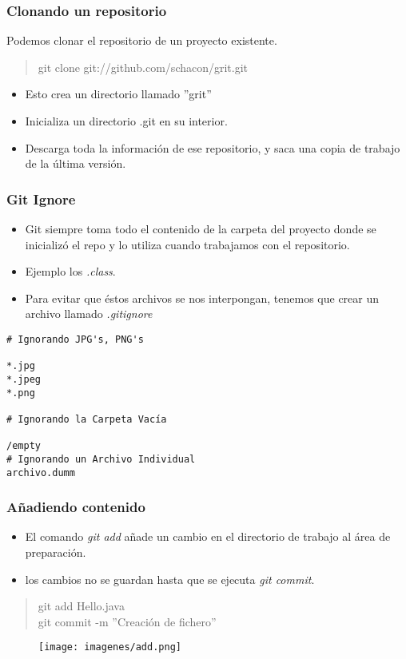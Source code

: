 \documentclass{beamer}
\begin{document}
\begin{frame}
\frametitle{Clonando un repositorio}
Podemos clonar el repositorio de un proyecto existente.
\begin{verse}
git clone git://github.com/schacon/grit.git
\end{verse}
\pause
\begin{itemize}[<+->]
\item Esto crea un directorio llamado ''grit''
\item Inicializa un directorio .git en su interior.
\item Descarga toda la información de ese repositorio, y saca una copia de trabajo de la última versión. 
\end{itemize}
\end{frame}

\begin{frame}[fragile]
\frametitle{Git Ignore}
\begin{itemize}
\item Git siempre toma todo el contenido de la carpeta del proyecto donde se inicializó el repo y lo utiliza cuando trabajamos con el repositorio. 
\item Ejemplo los \emph{.class}.
\item Para evitar que éstos archivos se nos interpongan, tenemos que crear un archivo llamado \emph{.gitignore} 
\end{itemize}
\pause
\begin{footnotesize}

\begin{verbatim}
# Ignorando JPG's, PNG's

*.jpg
*.jpeg
*.png

# Ignorando la Carpeta Vacía

/empty
# Ignorando un Archivo Individual
archivo.dumm
\end{verbatim}
\end{footnotesize}
\end{frame}


\begin{frame}
\frametitle{Añadiendo contenido}
\begin{itemize}[<+->]
\item El comando \emph{git add} añade un cambio en el directorio de trabajo al área de preparación. 
\item los cambios no se guardan hasta que se ejecuta \emph{git commit}.
\end{itemize}
\pause
\begin{verse}
git add Hello.java\\
git  commit -m ''Creación de fichero''
\end{verse}
\pause
\begin{figure}
\texttt{[image: imagenes/add.png]}
\end{figure}
\end{frame}
\end{document}
